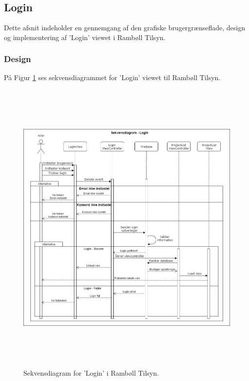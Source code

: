 \subsection{Login} \label{sec:Login}
Dette afsnit indeholder en gennemgang af den grafiske brugergrænseflade, design og implementering af 'Login' viewet i Rambøll Tilsyn.

\subsubsection{Design}
På Figur \ref{fig:LoginSekvens} ses sekvensdiagrammet for 'Login' viewet til Rambøll Tilsyn.
\begin{figure}[H] %
	\centering
	\includegraphics[height=15cm, width=15cm]{../ArkitekturDesign/Design/Login/LoginSekvensDiagram}
	\caption{Sekvensdiagram for 'Login' i Rambøll Tilsyn.}
	\label{fig:LoginSekvens}
\end{figure}

\clearpage

